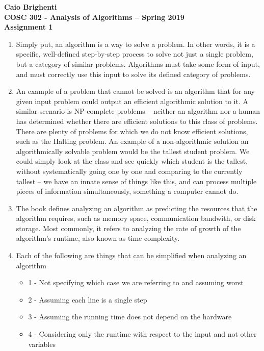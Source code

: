 \documentclass{article}
\begin{document}
\noindent \textbf{Caio Brighenti }\\
\noindent \textbf{COSC 302 - Analysis of Algorithms -- Spring 2019}\\%
\noindent \textbf{Assignment 1}\vspace{1em}\\
\begin{enumerate}
	\item 
	Simply put, an algorithm is a way to solve a problem. In other words, it is a specific, well-defined step-by-step process to solve not just a single problem, but a category of similar problems. Algorithms must take some form of input, and must correctly use this input to solve its defined category of problems.
	\item 
	An example of a problem that cannot be solved is an algorithm that for any given input problem could output an efficient algorithmic solution to it. A similar scenario is NP-complete problems -- neither an algorithm nor a human has determined whether there are efficient solutions to this class of problems. There are plenty of problems for which we do not know efficient solutions, such as the Halting problem. An example of a non-algorithmic solution an algorithmically solvable problem would be the tallest student problem. We could simply look at the class and see quickly which student is the tallest, without systematically going one by one and comparing to the currently tallest -- we have an innate sense of things like this, and can process multiple pieces of information simultaneously, something a computer cannot do.
	\item The book defines analyzing an algorithm as predicting the resources that the algorithm requires, such as memory space, communication bandwith, or disk storage. Most commonly, it refers to analyzing the rate of growth of the algorithm's runtime, also known as time complexity.
	\item Each of the following are things that can be simplified when analyzing an algorithm \begin{itemize}
		\item 1 - Not specifying which case we are referring to and assuming worst
		\item 2 - Assuming each line is a single step
		\item 3 - Assuming the running time does not depend on the hardware
		\item 4 - Considering only the runtime with respect to the input and not other variables					

\end{itemize}
\end{enumerate}
\end{document}
